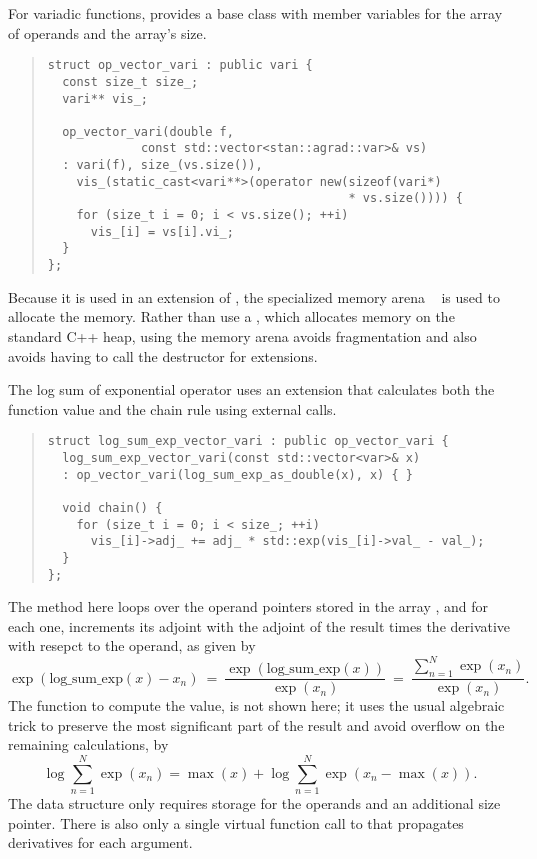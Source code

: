 \documentclass[10pt]{article}
\begin{document}
For variadic functions,  provides a base class
with member variables for the array of operands and the array's size.
%
\begin{quote}
\begin{Verbatim}
struct op_vector_vari : public vari {
  const size_t size_;
  vari** vis_;

  op_vector_vari(double f, 
             const std::vector<stan::agrad::var>& vs) 
  : vari(f), size_(vs.size()), 
    vis_(static_cast<vari**>(operator new(sizeof(vari*) 
                                          * vs.size()))) {
    for (size_t i = 0; i < vs.size(); ++i)
      vis_[i] = vs[i].vi_;
  }
};
\end{Verbatim}
\end{quote}
%
Because it is used in an extension of , the specialized
memory arena ~ is used to allocate the
memory.  Rather than use a , which allocates memory
on the standard C++ heap, using the memory arena avoids fragmentation
and also avoids having to call the destructor for  extensions.

The log sum of exponential operator uses an extension that calculates
both the function value and the chain rule using external calls.
%
\begin{quote}
\begin{Verbatim}
struct log_sum_exp_vector_vari : public op_vector_vari {
  log_sum_exp_vector_vari(const std::vector<var>& x)
  : op_vector_vari(log_sum_exp_as_double(x), x) { }

  void chain() {
    for (size_t i = 0; i < size_; ++i)
      vis_[i]->adj_ += adj_ * std::exp(vis_[i]->val_ - val_);
  }
};
\end{Verbatim}
\end{quote}
%
The  method here loops over the operand pointers stored
in the array , and for each one, increments its
adjoint with the adjoint of the result times the derivative with
resepct to the operand, as given by
%
\[
\exp(\mbox{log\_sum\_exp}(x) - x_n)
\ = \
\frac{\exp(\mbox{log\_sum\_exp}(x))}{\exp(x_n)}
\ = \
\frac{\sum_{n=1}^N \exp(x_n)}
     {\exp(x_n)}.
\]
%
The function to compute the value,  is
not shown here;  it uses the usual algebraic trick to preserve the
most significant part of the result and avoid overflow on the
remaining calculations, by
%
\[
\log \sum_{n=1}^N \exp(x_n)
= \max(x) + \log \sum_{n=1}^N \exp(x_n - \max(x)).
\]
%
The data structure only requires storage for the operands and an
additional size pointer.  There is also only a single virtual function
call to \code{chain} that propagates derivatives for each argument.
\end{document}
